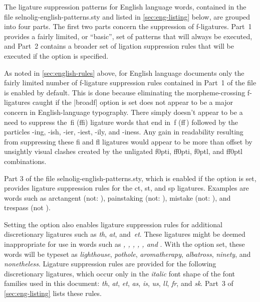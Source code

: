 \documentclass[11pt]{article}
\newcommand{\pkg}[1]{\textsf{#1}}
\newcommand{\opt}[1]{\uselig{\texttt{#1}}}
\begin{document}
The ligature suppression patterns for English language words, contained in the file \pkg{selnolig-english-patterns.sty} and listed in \cref{sec:eng-listing} below, are grouped into four parts. The first two parts concern the suppression of f-ligatures. Part~1 provides a fairly limited, or \enquote{basic}, set of patterns that will always be executed, and Part~2 contains a broader set of ligation suppression rules that will be executed if the \opt{broadf} option is specified. 

As noted in \cref{sec:english-rules} above, for English language documents only the fairly limited number of f-ligature suppression rules contained in Part~1 of the file is enabled by default. This is done because eliminating the morpheme-crossing f-ligatures caught if the |broadf| option is set does not appear to be a major concern in English-language typography. There simply doesn't appear to be a need to suppress the~fi (ffi) ligature words that end in~f (ff\,) followed by the particles -ing, -ish, -ier, -iest, -ily, and -iness. Any gain in readability resulting from suppressing these fi and fl ligatures would appear to be more than offset by unsightly visual clashes created by the unligated f\kern0pti, ff\kern0pti, f\kern0ptl, and ff\kern0ptl combinations.


Part 3 of the file \pkg{selnolig-english-patterns.sty}, which is enabled if the \opt{hdlig} option is set, provides ligature suppression rules for the ct, st, and sp ligatures. Examples are words such as arctangent (not: ), painstaking (not: ), mistake (not: ), and trespass (not ). 

Setting the \opt{hdlig} option also enables ligature suppression rules for additional discretionary ligatures such as \emph{th}, \emph{at}, and~\emph{et}. These ligatures might be deemed inappropriate for use in words such as \emph{, , , , , \emph{and} }. With the \opt{hdlig} option set, these words will be typeset as \emph{lighthouse}, \emph{pothole}, \emph{aromatherapy}, \emph{albatross}, \emph{ninety}, and \emph{nonetheless}. Ligature suppression rules are provided for the following discretionary ligatures, which occur only in the \emph{italic} font shape of the font families used in this document: \emph{th}, \emph{at}, \emph{et}, \emph{as}, \emph{is}, \emph{us}, \emph{ll}, \emph{fr}, and {\ebg \emph{sk}}. Part~3 of \cref{sec:eng-listing} lists these rules.
\end{document}
